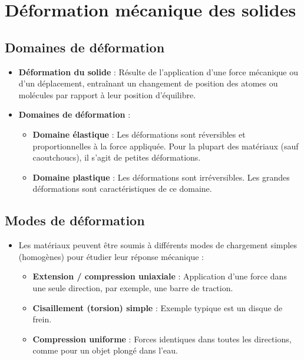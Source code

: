 \documentclass{article}
\begin{document}
\section{Déformation mécanique des solides}
    \subsection{Domaines de déformation}
    
    \begin{itemize}
        \item \textbf{Déformation du solide} : Résulte de l'application d'une force mécanique ou d'un déplacement, entraînant un changement de position des atomes ou molécules par rapport à leur position d'équilibre.
        \item \textbf{Domaines de déformation} :
        \begin{itemize}
            \item \textbf{Domaine élastique} : Les déformations sont réversibles et proportionnelles à la force appliquée. Pour la plupart des matériaux (sauf caoutchoucs), il s'agit de petites déformations.
            \item \textbf{Domaine plastique} : Les déformations sont irréversibles. Les grandes déformations sont caractéristiques de ce domaine.
        \end{itemize}
    \end{itemize}
    
    \subsection{Modes de déformation}
    
    \begin{itemize}
        \item Les matériaux peuvent être soumis à différents modes de chargement simples (homogènes) pour étudier leur réponse mécanique :
        \begin{itemize}
            \item \textbf{Extension / compression uniaxiale} : Application d'une force dans une seule direction, par exemple, une barre de traction.
            \item \textbf{Cisaillement (torsion) simple} : Exemple typique est un disque de frein.
            \item \textbf{Compression uniforme} : Forces identiques dans toutes les directions, comme pour un objet plongé dans l'eau.
        \end{itemize}
    \end{itemize}
    
\end{document}
